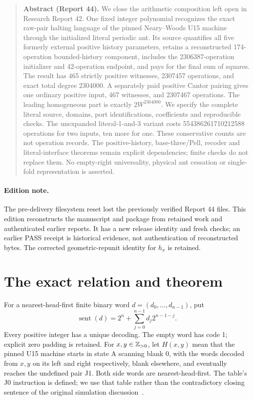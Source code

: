 \documentclass[11pt,letterpaper]{article}
\theoremstyle{definition}\newtheorem{definition}[theorem]{Definition}
\theoremstyle{remark}\newtheorem{remark}[theorem]{Remark}
\begin{document}
\begin{quote}\small\noindent\textbf{Abstract (Report 44).} We close the arithmetic composition left open in Research Report 42. One fixed integer polynomial recognizes the exact raw-pair halting language of the pinned Neary--Woods U15 machine through the initialized literal periodic ant. Its source quantifies all five formerly external positive history parameters, retains a reconstructed 174-operation bounded-history component, includes the 2306387-operation initializer and 42-operation endpoint, and pays for the final sum of squares. The result has 465 strictly positive witnesses, 2307457 operations, and exact total degree 2304000. A separately paid positive Cantor pairing gives one ordinary positive input, 467 witnesses, and 2307467 operations. The leading homogeneous part is exactly $2W^{2304000}$. We specify the complete literal source, domains, port identifications, coefficients and reproducible checks. The unexpanded literal-1-and-3 variant costs 554386261710212588 operations for two inputs, ten more for one. These conservative counts are not operation records. The positive-history, base-three/Pell, recoder and literal-interface theorems remain explicit dependencies; finite checks do not replace them. No empty-right universality, physical ant cessation or single-fold representation is asserted.
\end{quote}
\paragraph{Edition note.} The pre-delivery filesystem reset lost the previously verified Report 44 files. This edition reconstructs the manuscript and package from retained work and authenticated earlier reports. It has a new release identity and fresh checks; an earlier PASS receipt is historical evidence, not authentication of reconstructed bytes. The corrected geometric-repunit identity for $h_x$ is retained.

\section{The exact relation and theorem}\label{ptr:pc:sec:result}
For a nearest-head-first finite binary word $d=(d_0,\ldots,d_{n-1})$, put
\begin{equation}\label{ptr:pc:eq:sentinel}
 \operatorname{sent}(d)=2^n+\sum_{j=0}^{n-1}d_j2^{n-1-j}.
\end{equation}
Every positive integer has a unique decoding. The empty word has code 1; explicit zero padding is retained. For $x,y\in\mathbb Z_{>0}$, let $H(x,y)$ mean that the pinned U15 machine starts in state A scanning blank 0, with the words decoded from $x,y$ on its left and right respectively, blank elsewhere, and eventually reaches the undefined pair J1. Both side words are nearest-head-first. The table's J0 instruction is defined; we use that table rather than the contradictory closing sentence of the original simulation discussion~\cite{ptr:pc:nw}.
\end{document}
